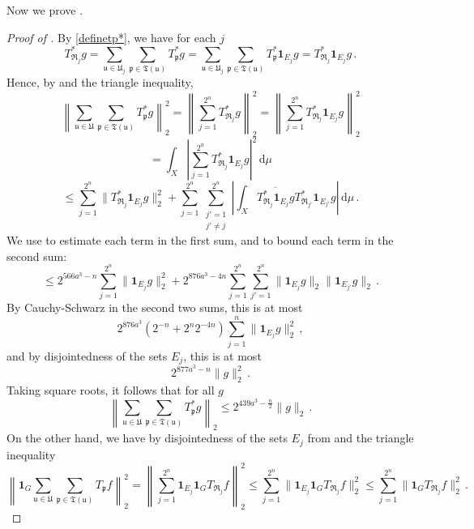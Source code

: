 \documentclass[10pt,a4paper]{article}
\theoremstyle{plain}
\theoremstyle{definition}
\numberwithin{equation}{subsection}
\newcommand{\fp}{{\mathfrak p}}
\newcommand{\fu}{{\mathfrak u}}
\newcommand{\fU}{{\mathfrak U}}
\newcommand{\fT}{{\mathfrak T}}
\newcommand{\proves}[1]{}
\newcommand{\leanok}{}
\begin{document}
Now we prove .

\begin{proof}[Proof of ]
    \leanok
    \proves{forest-operator}
    By \eqref{definetp*}, we have for each $j$
    $$
        T_{\mathfrak{R}_j}^*g = \sum_{\fu \in \fU_j} \sum_{\fp \in \fT(\fu)} T_{\fp}^* g = \sum_{\fu \in \fU_j} \sum_{\fp \in \fT(\fu)} T_{\fp}^* \mathbf{1}_{E_j} g = T_{\mathfrak{R}_j}^* \mathbf{1}_{E_j} g\,.
    $$
    Hence, by  and the triangle inequality,
    $$
        \left\|\sum_{\fu \in \fU} \sum_{\fp \in \fT(\fu)} T^*_{\fp} g\right\|_2^2 = \left\|\sum_{j = 1}^{2^n} T^*_{\mathfrak{R}_{j}} g\right\|_2^2 = \left\|\sum_{j=1}^{2^n} T^*_{\mathfrak{R}_{j}} \mathbf{1}_{E_j} g\right\|_2^2
    $$
    $$
        = \int_X \left|\sum_{j=1}^{2^n} T^*_{\mathfrak{R}_{j}} \mathbf{1}_{E_j} g\right|^2 \, \mathrm{d}\mu
    $$
    $$
        \le \sum_{j=1}^{2^n} \|T_{\mathfrak{R}_j}^* \mathbf{1}_{E_j} g\|_2^2 + \sum_{j =1}^{2^n} \sum_{\substack{j' = 1\\j' \ne j}}^{2^n} \left| \int_X \overline{ T_{\mathfrak{R}_j}^* \mathbf{1}_{E_j} g} T_{\mathfrak{R}_{j'}}^* \mathbf{1}_{E_{j'}} g \right| \, \mathrm{d}\mu\,.
    $$
    We use  to estimate each term in the first sum, and  to bound each term in the second sum:
    $$
        \le 2^{566a^3-n} \sum_{j = 1}^{2^n} \|\mathbf{1}_{E_j} g\|_2^2 + 2^{876a^3-4n}\sum_{j=1}^{2^n}\sum_{j' = 1}^{2^n} \|\mathbf{1}_{E_j} g\|_2 \|\mathbf{1}_{E_{j'}}g\|_2\,.
    $$
    By Cauchy-Schwarz in the second two sums, this is at most
    $$
        2^{876a^3} (2^{-n} + 2^{n}2^{-4n}) \sum_{j = 1}^n \|\mathbf{1}_{E_j} g\|_2^2\,,
    $$
    and by disjointedness of the sets $E_j$, this is at most
    $$
        2^{877a^3 - n} \|g\|_2^2\,.
    $$
    Taking square roots, it follows that for all $g$
    \begin{equation}
        \label{eq-forest-bound-1}
        \left\|\sum_{\fu \in \fU} \sum_{\fp \in \fT(\fu)} T_{\fp}^* g\right\|_2 \le 2^{439a^3-\frac{n}{2}} \|g\|_2\,.
    \end{equation}
    On the other hand, we have by disjointedness of the sets $E_j$ from  and the triangle inequality
    $$
        \left\|\mathbf{1}_G \sum_{\fu \in \fU} \sum_{\fp \in \fT(\fu)} T_{\fp} f\right\|_2^2 = \left\|\sum_{j=1}^{2^n} \mathbf{1}_{E_j} \mathbf{1}_G T_{\mathfrak{R}_{j}} f\right\|_2^2 \le \sum_{j = 1}^{2^n} \|\mathbf{1}_{E_j} \mathbf{1}_G T_{\mathfrak{R}_{j}} f\|_2^2 \le \sum_{j = 1}^{2^n} \|\mathbf{1}_G T_{\mathfrak{R}_{j}} f\|_2^2\,.
$$
\end{proof}
\end{document}
